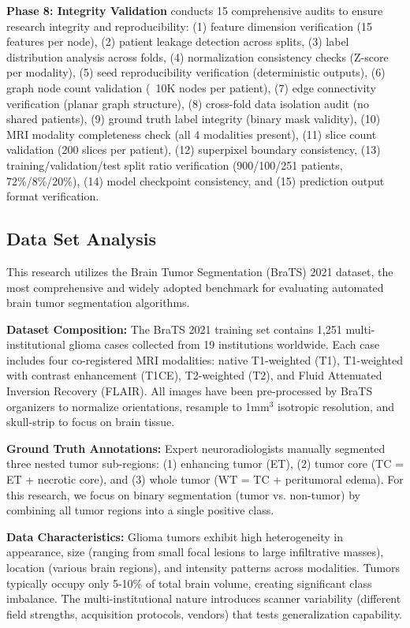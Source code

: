 \textbf{Phase 8: Integrity Validation} conducts 15 comprehensive audits to ensure research integrity and reproducibility: (1) feature dimension verification (15 features per node), (2) patient leakage detection across splits, (3) label distribution analysis across folds, (4) normalization consistency checks (Z-score per modality), (5) seed reproducibility verification (deterministic outputs), (6) graph node count validation (~10K nodes per patient), (7) edge connectivity verification (planar graph structure), (8) cross-fold data isolation audit (no shared patients), (9) ground truth label integrity (binary mask validity), (10) MRI modality completeness check (all 4 modalities present), (11) slice count validation (200 slices per patient), (12) superpixel boundary consistency, (13) training/validation/test split ratio verification (900/100/251 patients, 72\%/8\%/20\%), (14) model checkpoint consistency, and (15) prediction output format verification.


\subsection{Data Set Analysis}

This research utilizes the Brain Tumor Segmentation (BraTS) 2021 dataset, the most comprehensive and widely adopted benchmark for evaluating automated brain tumor segmentation algorithms.

\textbf{Dataset Composition:} The BraTS 2021 training set contains 1,251 multi-institutional glioma cases collected from 19 institutions worldwide. Each case includes four co-registered MRI modalities: native T1-weighted (T1), T1-weighted with contrast enhancement (T1CE), T2-weighted (T2), and Fluid Attenuated Inversion Recovery (FLAIR). All images have been pre-processed by BraTS organizers to normalize orientations, resample to 1mm$^3$ isotropic resolution, and skull-strip to focus on brain tissue.

\textbf{Ground Truth Annotations:} Expert neuroradiologists manually segmented three nested tumor sub-regions: (1) enhancing tumor (ET), (2) tumor core (TC = ET + necrotic core), and (3) whole tumor (WT = TC + peritumoral edema). For this research, we focus on binary segmentation (tumor vs. non-tumor) by combining all tumor regions into a single positive class.

\textbf{Data Characteristics:} Glioma tumors exhibit high heterogeneity in appearance, size (ranging from small focal lesions to large infiltrative masses), location (various brain regions), and intensity patterns across modalities. Tumors typically occupy only 5-10\% of total brain volume, creating significant class imbalance. The multi-institutional nature introduces scanner variability (different field strengths, acquisition protocols, vendors) that tests generalization capability.


